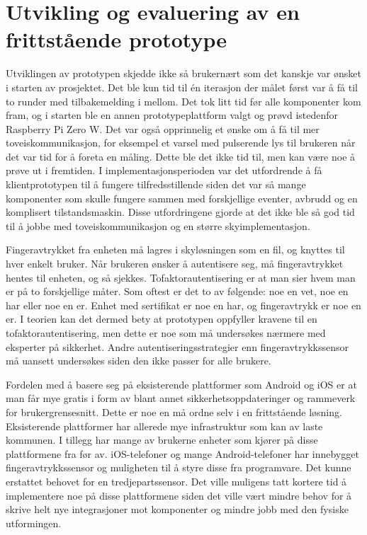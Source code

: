 \section{Utvikling og evaluering av en frittstående prototype}
Utviklingen av prototypen skjedde ikke så brukernært som det kanskje var ønsket i starten av prosjektet. Det ble kun tid
til én iterasjon der målet først var å få til to runder med tilbakemelding i mellom. Det tok litt tid før alle komponenter kom fram,
og i starten ble en annen prototypeplattform valgt og prøvd istedenfor Raspberry Pi Zero W.
Det var også opprinnelig et ønske om å få til mer toveiskommunikasjon, for eksempel et varsel med pulserende lys til brukeren
når det var tid for å foreta en måling. Dette ble det ikke tid til, men kan være noe å prøve ut i fremtiden. I implementasjonsperioden
var det utfordrende å få klientprototypen til å fungere tilfredsstillende siden det var så mange komponenter som skulle fungere sammen
med forskjellige eventer, avbrudd og en komplisert tilstandsmaskin. Disse utfordringene gjorde at det ikke ble så god tid til å jobbe
med toveiskommunikasjon og en større skyimplementasjon.

Fingeravtrykket fra enheten må lagres i skyløsningen som en fil, og knyttes til hver enkelt bruker. Når brukeren
ønsker å autentisere seg, må fingeravtrykket hentes til enheten, og så sjekkes. Tofaktorautentisering er at man
sier hvem man er på to forskjellige måter. Som oftest er det to av følgende: noe en vet, noe en har eller noe en er.
Enhet med sertifikat er noe en har, og fingeravtrykk er noe en er. I teorien kan det dermed bety at prototypen
oppfyller kravene til en tofaktorautentisering, men dette er noe som må undersøkes nærmere med eksperter på sikkerhet.
Andre autentiseringsstrategier enn fingeravtrykkssensor må uansett undersøkes siden den ikke passer for alle brukere.

Fordelen med å basere seg på eksisterende plattformer som Android og iOS er at man får mye gratis i form
av blant annet sikkerhetsoppdateringer og rammeverk for brukergrensesnitt. Dette er noe en må ordne selv i en
frittstående løsning. Eksisterende plattformer har allerede mye infrastruktur som kan av laste kommunen. I tillegg
har mange av brukerne enheter som kjører på disse plattformene fra før av. iOS-telefoner og mange Android-telefoner
har innebygget fingeravtrykkssensor og muligheten til å styre disse fra programvare. Det kunne erstattet behovet for
en tredjepartssensor. Det ville muligens tatt kortere tid å implementere noe på disse plattformene siden det ville vært
mindre behov for å skrive helt nye integrasjoner mot komponenter og mindre jobb med den fysiske utformingen.

